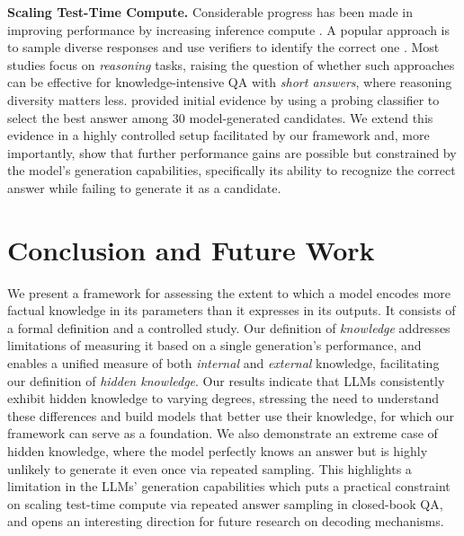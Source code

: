 \textbf{Scaling Test-Time Compute.}
Considerable progress has been made in improving performance by increasing inference compute  \citep{snell2024scaling, OpenAI2024O1,guo2025deepseek}. 
A popular approach is to sample diverse responses and use verifiers to identify the correct one \citep{brown2024large,hassid2024the,zhao2025sample}.
Most studies focus on \textit{reasoning} tasks, raising 
the question of whether such approaches can be effective for knowledge-intensive QA with \textit{short answers}, where reasoning diversity matters less.
\citet{orgad2024llms} provided initial evidence by using a probing classifier to select the best answer among 30 model-generated candidates. 
We extend this evidence in a highly controlled setup facilitated by our framework and, more importantly,  show that further performance gains are possible but constrained by the model’s generation capabilities, specifically its ability to recognize the correct answer while failing to generate it as a candidate.

\vspace{-7pt}
\section{Conclusion and Future Work}
\label{sec:conclusion}
\vspace{-7pt}


We present a framework for assessing the extent to which a model encodes more factual knowledge in its parameters than it expresses in its outputs.
It consists of a formal definition and a controlled study. Our definition of \textit{knowledge} addresses limitations of measuring it based on a single generation’s performance, and enables a unified measure of both \textit{internal} and \textit{external} knowledge, facilitating our definition of \textit{hidden knowledge}. Our results indicate that LLMs consistently exhibit hidden knowledge to varying degrees, stressing the need to understand these differences and build models that better use their knowledge, for which our framework can serve as a foundation. We also demonstrate an extreme case of hidden knowledge, where the model perfectly knows an answer but is highly unlikely to generate it even once via repeated sampling. This highlights a limitation in the LLMs' generation capabilities which puts a practical constraint on scaling test-time compute via repeated answer sampling in closed-book QA, and opens an interesting direction for future research on decoding mechanisms. 

